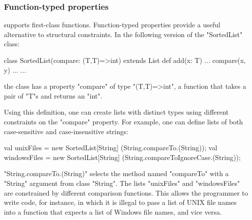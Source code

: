 
\subsubsection{Function-typed properties}

\Xten{} supports first-class functions.
Function-typed properties provide a useful alternative to
structural constraints.  In the
following version of the
\xcd"SortedList" class:
{
\begin{xten}
class SortedList(compare: (T,T)=>int)
    extends List {
  def add(x: T) {... compare(x, y) ...}
  ... }
\end{xten}}
\noindent
the class has a property \xcd"compare" of type
\xcd"(T,T)=>int", a function that takes a pair of \xcd"T"s and
returns an \xcd"int".  

Using this definition, one can create lists with distinct types
using different constraints on the \xcd"compare" property.
For example, one can define lists of
both
case-sensitive and case-insensitive strings:
\bigskip
{
\begin{xten}
val unixFiles
  = new SortedList[String]
      (String.compareTo.(String));
val windowsFiles
  = new SortedList[String]
      (String.compareToIgnoreCase.(String));
\end{xten}}

\noindent
\xcd"String.compareTo.(String)" selects the
method named
\xcd"compareTo" with a \xcd"String" argument from
class \xcd"String".
%
The lists \xcd"unixFiles" and \xcd"windowsFiles" are constrained
by different comparison functions.  This allows the programmer
to write code, for instance, in which it is illegal to pass a list of UNIX
file names into a function that expects a list of Windows file names, and
vice versa.

